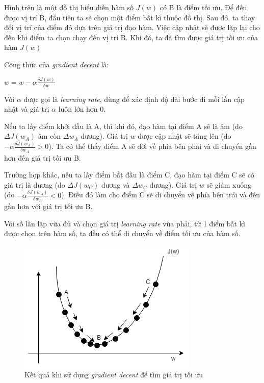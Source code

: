 Hình trên là một đồ thị biểu diễn hàm số $J(w)$ có B là điểm tối ưu. Để đến được vị trí B, đầu tiên ta sẽ chọn một điểm bất kì thuộc đồ thị. Sau đó, ta thay đổi vị trí của điểm đó dựa trên giá trị đạo hàm. Việc cập nhật sẽ được lặp lại cho đến khi điểm ta chọn chạy đến vị trí B. Khi đó, ta đã tìm được giá trị tối ưu của hàm $J(w)$

Công thức của \textit{gradient decent} là:
\begin{center}
$w = w - \alpha\frac{\delta J(w)}{\delta w}$
\end{center}

Với $\alpha$ được gọi là \textit{learning rate}, dùng để xác định độ dài bước đi mỗi lần cập nhật và giá trị $\alpha$ luôn lớn hơn $0$.

Nếu ta lấy điểm khởi đầu là A, thì khi đó, đạo hàm tại điểm A sẽ là âm (do $\Delta J(w_{A})$ âm còn $\Delta w_{A}$ dương). Giá trị $w$ được cập nhật sẽ tăng lên (do $-\alpha\frac{\delta J(w_{A})}{\delta w_{A}} > 0$). Ta có thể thấy điểm A sẽ dời về phía bên phải và di chuyển gần hơn đến giá trị tối ưu B.

Trường hợp khác, nếu ta lấy điểm bắt đầu là điểm C, đạo hàm tại điểm C sẽ có giá trị là dương (do $\Delta J(w_{C})$ dương và $\Delta w_{C}$ dương). Giá trị $w$ sẽ giảm xuống (do $-\alpha\frac{\delta J(w_{A})}{\delta w_{A}} < 0$). Điều đó làm cho điểm C sẽ di chuyển về phía bên trái và đến gần hơn với giá trị tối ưu B.

Với số lần lặp vừa đủ và chọn giá trị \textit{learning rate} vừa phải, từ 1 điểm bất kì được chọn trên hàm số, ta đều có thể di chuyển về điểm tối ưu của hàm số.

\begin{figure}[!h]
\centerline{\includegraphics{chapter02/figure/grad_2.png}}
\caption{Kết quả khi sử dụng \textit{gradient decent} để tìm giá trị tối ưu}
\label{fig:grad_2}
\end{figure}

